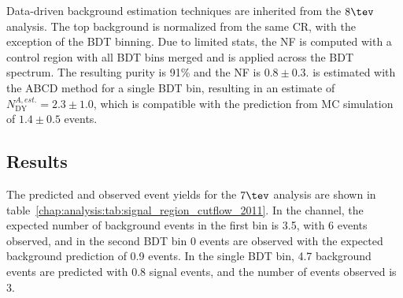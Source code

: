 Data-driven background estimation techniques are inherited from the
$8 \tev$ analysis. The top background is normalized from the same CR,
with the exception of the BDT binning. Due to limited stats, the NF is
computed with a control region with all BDT bins merged and is applied across
the BDT spectrum. The resulting purity is 91\% and the NF is $0.8 \pm 0.3$. \ZDYll is
estimated with the ABCD method for a single BDT bin, resulting in an
estimate of $N_{\mathrm{DY}}^{A,est.} = 2.3 \pm 1.0$, which is
compatible with the prediction from MC simulation of $1.4 \pm 0.5$
events. 




\subsection{Results}
\label{chap:analysis:sec:reanalysis:subsec:results}

The predicted and observed event yields for the $7 \tev$ analysis are
shown in table~\ref{chap:analysis:tab:signal_region_cutflow_2011}. In
the \emme channel, the expected number of background events in the
first bin is 3.5, with 6 events observed, and in the second BDT bin
0 events are observed with the expected background prediction of 0.9
events. In the single \eemm BDT bin, 4.7 background events are
predicted with 0.8 signal events, and the number of events observed is
3. 

